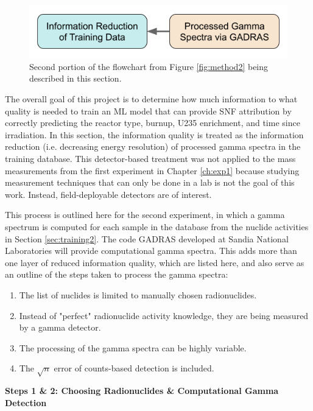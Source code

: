 \begin{figure}[H]
  \centering
  \includegraphics[width=0.7\linewidth]{./chapters/exp2/methodology2_2.png}
  \caption{Second portion of the flowchart from Figure \ref{fig:method2} being 
           described in this section.}
\end{figure}

The overall goal of this project is to determine how much information to what
quality is needed to train an  \gls{ML}
model that can provide \gls{SNF} attribution by correctly predicting the
reactor type, burnup, \gls{U235} enrichment, and time since irradiation.  In
this section, the information quality is treated as the information reduction
(i.e. decreasing energy resolution) of processed gamma spectra in the training
database.  This detector-based treatment was not applied to the mass
measurements from the first experiment in Chapter \ref{ch:exp1} because
studying measurement techniques that can only be done in a lab is not the goal
of this work.  Instead, field-deployable detectors are of interest.

This process is outlined here for the second experiment, in which a gamma
spectrum is computed for each sample in the database from the nuclide
activities in Section \ref{sec:training2}.  The code \gls{GADRAS} \cite{gadras}
developed at Sandia National Laboratories will provide computational gamma
spectra.  This adds more than one layer of reduced information quality, which
are listed here, and also serve as an outline of the steps taken to process the 
gamma spectra:
\begin{enumerate}
  \item \label{itm:1} The list of nuclides is limited to manually chosen 
        radionuclides.
  \item \label{itm:2} Instead of "perfect" radionuclide activity knowledge, 
        they are being measured by a gamma detector.
  \item \label{itm:3} The processing of the gamma spectra can be highly variable.
  \item \label{itm:4} The $\sqrt{n}$ error of counts-based detection is included. 
\end{enumerate}

\noindent \textbf{Steps 1 \& 2: Choosing Radionuclides \& Computational Gamma Detection}


